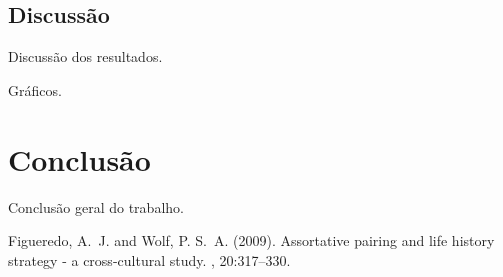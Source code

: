\documentclass[twoside]{article}
\begin{document}
\begin{multicols}{2}
\subsection{Discussão}

Discussão dos resultados.

Gráficos.

\section{Conclusão}

Conclusão geral do trabalho.


\begin{thebibliography}{99} %

Figueredo, A.~J. and Wolf, P. S.~A. (2009).
\newblock Assortative pairing and life history strategy - a cross-cultural
  study.
, 20:317--330.
 
\end{thebibliography}


\end{multicols}
\end{document}
